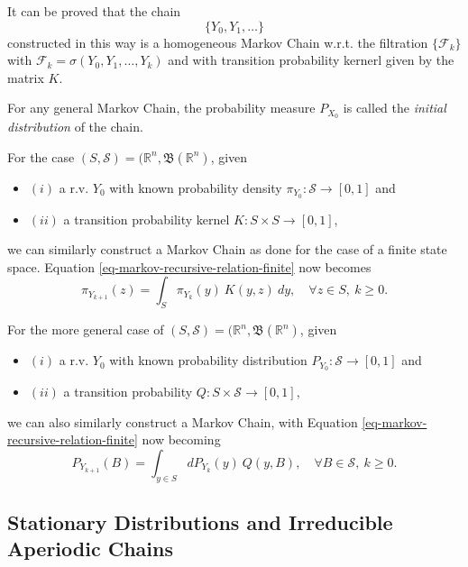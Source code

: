It can be proved that the chain
\begin{equation*}
\{Y_0,Y_1,\ldots\}
\end{equation*}
constructed in this way is a homogeneous Markov Chain
w.r.t. the filtration $\{\mathcal{F}_k\}$ with $\mathcal{F}_k=\sigma(Y_0,Y_1,\ldots,Y_k)$ and
with transition probability kernerl given by the matrix $K$.

For any general Markov Chain, the probability measure $P_{X_0}$ is called the {\it initial distribution} of the chain.

For the case $(S,\mathcal{S})=(\mathbb{R}^n,\mathfrak{B}(\mathbb{R}^n)$, given
{\renewcommand{\labelitemi}{}
\begin{itemize}
\item $(i)$ a r.v. $Y_0$ with known probability density $\pi_{Y_0}:\mathcal{S}\rightarrow [0,1]$ and
\item $(ii)$ a transition probability kernel $K:S\times S\rightarrow [0,1]$,
\end{itemize}
}
we can similarly construct a Markov Chain as done for the case of a finite state space.
Equation \eqref{eq-markov-recursive-relation-finite} now becomes
\begin{equation}\label{eq-markov-recursive-relation-Rac}
\pi_{Y_{k+1}}(z) = \int_{S}\pi_{Y_k}(y)~K(y,z)~dy,\quad\forall z\in S,~k\geqslant 0.
\end{equation}

For the more general case of $(S,\mathcal{S})=(\mathbb{R}^n,\mathfrak{B}(\mathbb{R}^n)$, given
{\renewcommand{\labelitemi}{}
\begin{itemize}
\item $(i)$ a r.v. $Y_0$ with known probability distribution $P_{Y_0}:\mathcal{S}\rightarrow [0,1]$ and
\item $(ii)$ a transition probability $Q:S\times\mathcal{S}\rightarrow [0,1]$,
\end{itemize}
}
we can also similarly construct a Markov Chain, with
Equation \eqref{eq-markov-recursive-relation-finite} now becoming
\begin{equation}\label{eq-markov-recursive-relation-R}
P_{Y_{k+1}}(B) = \int_{y\in S}dP_{Y_k}(y)~Q(y,B),\quad\forall B\in\mathcal{S},~k\geqslant 0.
\end{equation}

\subsection{Stationary Distributions and Irreducible Aperiodic Chains}

